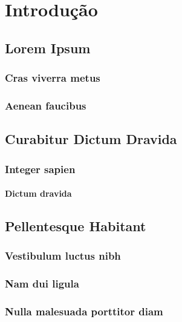 \chapter{Introdução}

    \section{Lorem Ipsum}

        \lipsum

        \subsection{Cras viverra metus}

            \lipsum[1-2] \cite{LaTeX}

        \subsection{Aenean faucibus}

            \lipsum[2-3] \cite{google}

    \section{Curabitur Dictum Dravida}

        \lipsum[3-4] \cite{linux}

        \subsection{Integer sapien}

            \lipsum[4-5] \cite{html}

            \subsubsection{Dictum dravida}

                \lipsum[3] \cite{css}

    \section{Pellentesque Habitant}

        \lipsum[5-6] \cite{javascript}

        \subsection{Vestibulum luctus nibh}

            \lipsum[1-2] \cite{php}

        \subsection{Nam dui ligula}

            \lipsum[3-4] \cite{python}

        \subsection{Nulla malesuada porttitor diam}

            \lipsum[5-6] \cite{arduino}
